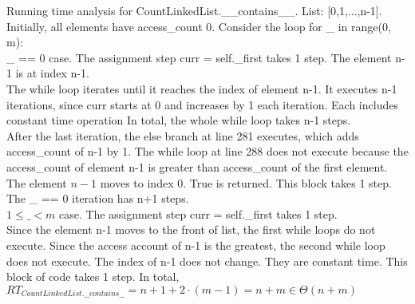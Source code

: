 \documentclass[fontsize=11pt]{article}
\begin{document}
\begin{enumerate}
\begin{enumerate}
    Running time analysis for CountLinkedList.\_\_contains\_\_.
    List: [0,1,...,n-1]. Initially, all elements have access\_count 0.
    Consider the loop for \_ in range(0, m):
    \\\_ == 0 case. The assignment step curr = self.\_first takes 1 step. The element n-1 is at index n-1.
    \\The while loop iterates until it reaches the index of element n-1. It executes n-1 iterations, since curr starts at 0 and increases by 1 each iteration. Each includes constant time operation In total, the whole while loop takes n-1 steps.
    \\After the last iteration, the else branch at line 281 executes, which adds access\_count of n-1 by 1. The while loop at line 288 does not execute because the access\_count of element n-1 is greater than access\_count of the first element. The element $n-1$ moves to index 0. True is returned. This block takes 1 step.
    \\The \_ == 0 iteration has n+1 steps.
    \\$1\leq \_ <m$ case. The assignment step curr = self.\_first takes 1 step.\\ Since the element n-1 moves to the front of list, the first while loops do not execute. Since the access account of n-1 is the greatest, the second while loop does not execute. The index of n-1 does not change. They are constant time. This block of code takes 1 step.
    In total, $RT_{CountLinkedList.\_\_contains\_\_}=n+1+2\cdot(m-1)=n+m\in \Theta(n+m)$

\end{enumerate}


\end{enumerate}
\end{document}
